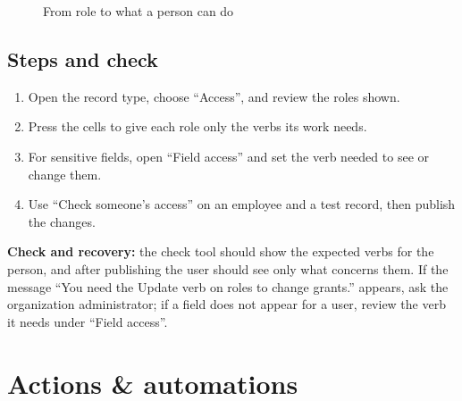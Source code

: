 \begin{figure}[H]
\centering
{}
\rclegend
\caption{From role to what a person can do}
\label{fig:builder-access-model}
\end{figure}

\subsection{Steps and check}
\begin{enumerate}
\item Open the record type, choose “Access”, and review the roles shown.
\item Press the cells to give each role only the verbs its work needs.
\item For sensitive fields, open “Field access” and set the verb needed to see or change them.
\item Use “Check someone's access” on an employee and a test record, then publish the changes.
\end{enumerate}

\textbf{Check and recovery:} the check tool should show the expected verbs for the person, and after publishing the user should see only what concerns them. If the message “You need the Update verb on roles to change grants.” appears, ask the organization administrator; if a field does not appear for a user, review the verb it needs under “Field access”.

\clearpage
\section{Actions \& automations}
\label{sec:builder-feature-actions}

